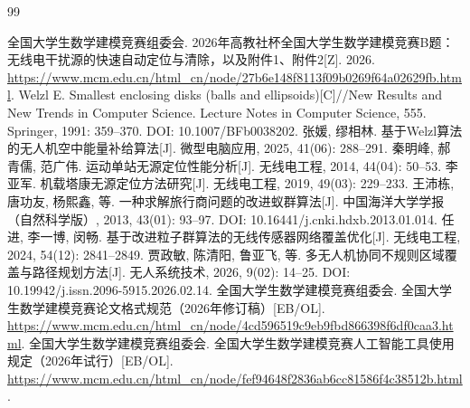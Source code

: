 \documentclass[UTF8,fontset=fandol,a4paper,zihao=-4]{ctexart}
\begin{document}
\begin{thebibliography}{99}
\raggedright
{} 全国大学生数学建模竞赛组委会. 2026年高教社杯全国大学生数学建模竞赛B题：无线电干扰源的快速自动定位与清除，以及附件1、附件2[Z]. 2026. \url{https://www.mcm.edu.cn/html_cn/node/27b6e148f8113f09b0269f64a02629fb.html}.
 Welzl E. Smallest enclosing disks (balls and ellipsoids)[C]//New Results and New Trends in Computer Science. Lecture Notes in Computer Science, 555. Springer, 1991: 359--370. DOI: 10.1007/BFb0038202.
 张媛, 缪相林. 基于Welzl算法的无人机空中能量补给算法[J]. 微型电脑应用, 2025, 41(06): 288--291.
 秦明峰, 郝青儒, 范广伟. 运动单站无源定位性能分析[J]. 无线电工程, 2014, 44(04): 50--53.
 李亚军. 机载塔康无源定位方法研究[J]. 无线电工程, 2019, 49(03): 229--233.
 王沛栋, 唐功友, 杨熙鑫, 等. 一种求解旅行商问题的改进蚁群算法[J]. 中国海洋大学学报（自然科学版）, 2013, 43(01): 93--97. DOI: 10.16441/j.cnki.hdxb.2013.01.014.
 任进, 李一博, 闵畅. 基于改进粒子群算法的无线传感器网络覆盖优化[J]. 无线电工程, 2024, 54(12): 2841--2849.
 贾政敏, 陈清阳, 鲁亚飞, 等. 多无人机协同不规则区域覆盖与路径规划方法[J]. 无人系统技术, 2026, 9(02): 14--25. DOI: 10.19942/j.issn.2096-5915.2026.02.14.
 全国大学生数学建模竞赛组委会. 全国大学生数学建模竞赛论文格式规范（2026年修订稿）[EB/OL]. \url{https://www.mcm.edu.cn/html_cn/node/4cd596519c9eb9fbd866398f6df0caa3.html}.
 全国大学生数学建模竞赛组委会. 全国大学生数学建模竞赛人工智能工具使用规定（2026年试行）[EB/OL]. \url{https://www.mcm.edu.cn/html_cn/node/fef94648f2836ab6cc81586f4c38512b.html}.
\end{thebibliography}
\label{endbody}
\clearpage
\appendix

\end{document}
